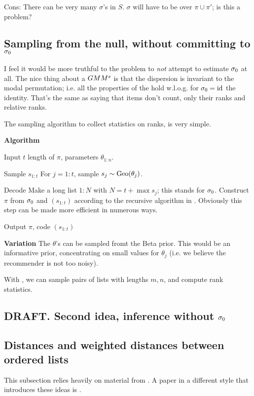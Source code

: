 \documentclass[10pt]{article}
\begin{document}
Cons: There can be very many $\sigma$'s in $S$. $\sigma$ will have to be over $\pi\cup \pi'$; is this a problem?

\subsection{Sampling from the null, without committing to $\sigma_0$}
\label{sec:gmm-sampling}
I feel it would be more truthful to the problem to {\em not} attempt to estimate $\sigma_0$ at all. The nice thing about a $GMM^s$ is that the dispersion is invariant to the modal permutation; i.e. all the properties of the \gmms hold w.l.o.g. for $\sigma_0={\rm id}$ the identity. That's the same as saying that items don't count, only their ranks and relative ranks.

The sampling algorithm to collect statistics on ranks, is very simple.

\benum
\item[]{\bf Algorithm} \algsamgmm
\item[Input] $t$ length of $\pi$,  parameters $\theta_{1:n}$.
\item[Sample $s_{1:t}$] For $j=1:t$, sample $s_j\sim \operatorname{Geo}(\theta_j)$.
\item[Decode] Make a long list $1:N$ with $N=t+\max s_j$; this stands for $\sigma_0$. Construct $\pi$ from $\sigma_0$ and $(s_{1:t})$ according to the recursive algorithm in \cite{MBao}. Obviously this step can be made more efficient in numerous ways. 
\item[Output] $\pi$, code $(s_{1:t})$
  \eenum

  {\bf Variation} The $\theta$'s can be sampled fromt the Beta prior. This would be an informative prior, concentrating on small values for $\theta_j$ (i.e. we believe the recommender is not too noisy).

  With \algsamgmm, we can sample pairs of lists with lengths $m,n$, and compute rank statistics. 

\subsection{DRAFT. Second idea, inference without $\sigma_0$}
\label{sec:gmm-delta}


\subsection{Distances and weighted distances between ordered lists} 
\label{sec:distances}
This subsection relies heavily on material from \cite{MBao}. A paper in a different style that introduces these ideas is \cite{fligner:86}.
\end{document}

